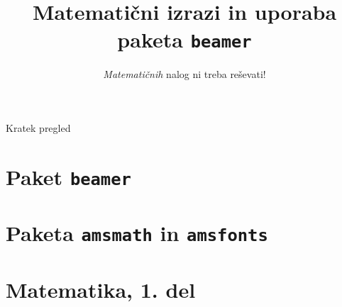 \documentclass{beamer}
\begin{document}
\title{Matematični izrazi in uporaba paketa \texttt{beamer}}
\subtitle{\emph{Matematičnih} nalog ni treba reševati!}
\date{}
\titlepage

\begin{frame}{Kratek pregled}
    \tableofcontents[pausesections]
\end{frame}


\section{Paket \texttt{beamer}}




\section{Paketa \texttt{amsmath} in \texttt{amsfonts}}




\section[Matematika, 1. del\\\large{Analiza, logika, množice}]{Matematika, 1. del}
\end{document}
